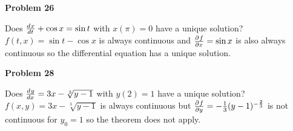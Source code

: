 \textbf{Problem 26}

Does $\frac{d^{} x}{d t^{}} + \cos x = \sin t$ with $x(\pi) = 0$
have a unique solution? \\
\solution 
$f(t,x) = \sin t-\cos x$ is always continuous and 
$\frac{\partial^{} f}{\partial x^{}} = \sin x$ is also always continuous so 
the differential equation has a unique solution.

\textbf{Problem 28}

Does $\frac{d^{} y}{d x^{}} = 3x - \sqrt[3]{y-1}$ with $y(2) = 1$
have a unique solution? \\
\solution 
$f(x, y) = 3x - \sqrt[3]{y-1}$ is always continuous but
$\frac{\partial^{} f}{\partial y^{}} = -\frac{1}{3}(y-1)^{-\frac{2}{3}}$ 
is not continuous for $y_0 = 1$ so 
the theorem does not apply.

\newpage 